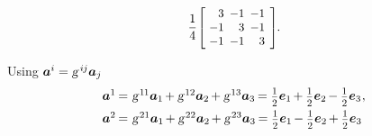 \begin{otherlanguage}{russian}
\begin{tcolorbox}
\[\begin{array}{c}
\displaystyle \frac{1}{4} \hspace{.12ex}
\scalebox{.92}{$\left[\hspace{-0.4ex}\begin{array}{r@{\hspace{.5em}}r@{\hspace{.5em}}r}
3 & -1 & -1 \\
-1 & 3 & -1 \\
-1 & -1 & 3
\end{array}\hspace{-0.12ex}\right]^{\mathstrut}$} \hspace{-0.25ex}.
\end{array}\]

\vspace{-0.5em}Using ${\bm{a}^i = \textsl{g}^{\hspace{.32ex}i\hspace{-0.1ex}j} \bm{a}_j}$
\[\begin{array}{l}
\bm{a}^1 \hspace{-0.2ex}=\hspace{.1ex} \textsl{g}^{\hspace{.2ex}1\hspace{-0.1ex}1} \bm{a}_1 \hspace{-0.2ex} + \textsl{g}^{\hspace{.2ex}12} \bm{a}_2 \hspace{-0.2ex} + \textsl{g}^{\hspace{.2ex}13} \bm{a}_3 \hspace{-0.2ex} = \smalldisplaystyleonehalf \bm{e}_1 \hspace{-0.2ex} + \smalldisplaystyleonehalf \bm{e}_2 \hspace{-0.2ex} - \smalldisplaystyleonehalf \bm{e}_3
\hspace{.1ex} ,
\\[.5em]
%
\bm{a}^2 \hspace{-0.2ex}=\hspace{.1ex} \textsl{g}^{\hspace{.2ex}21} \bm{a}_1 \hspace{-0.2ex} + \textsl{g}^{\hspace{.2ex}22} \bm{a}_2 \hspace{-0.2ex} + \textsl{g}^{\hspace{.2ex}23} \bm{a}_3 \hspace{-0.2ex} = \smalldisplaystyleonehalf \bm{e}_1 \hspace{-0.2ex} - \smalldisplaystyleonehalf \bm{e}_2 \hspace{-0.2ex} + \smalldisplaystyleonehalf \bm{e}_3

\end{array}\]
\end{tcolorbox}
\end{otherlanguage}
